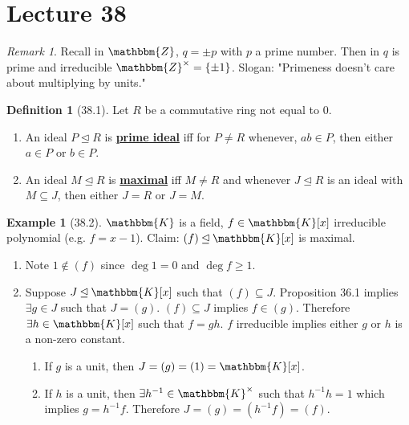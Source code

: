 \documentclass{article}
\newcommand{\Z}{\mathbbm{Z}}
\newcommand{\inverse}[1]{#1^{-1}}
\newcommand{\define}[1]{\textbf{\underline{#1}}}
\renewcommand{\Subset}{\subseteq}
\theoremstyle{definition}
\newtheorem*{defn}{Definition}
\newtheorem*{ex}{Example}
\theoremstyle{remark}
\newtheorem*{rmk}{Remark}
\newcommand{\ideal}{\unlhd}
\newcommand{\K}{\mathbbm{K}}
\begin{document}
    \section*{Lecture 38}{
        \begin{rmk}
            Recall in $\Z$, $q= \pm p$ with $p$ a prime number. Then in $q$ is prime and irreducible $\Z^\times =\{\pm 1\}$. Slogan: "Primeness doesn't care about multiplying by units."
        \end{rmk}
        
        \begin{defn}[38.1]
            Let $R$ be a commutative ring not equal to $0$.
            \begin{enumerate}
                \item An ideal $P \ideal R$ is \define{prime ideal} iff for $P\neq R$ whenever, $ab \in P$, then either $a \in P$ or $b \in P$.
                \item An ideal $M \ideal R$ is \define{maximal} iff $M\neq R$ and whenever $J \ideal R$ is an ideal with $M \Subset J$, then either $J=R$ or $J=M$.
            \end{enumerate}
        \end{defn}
        
    \begin{ex}[38.2]
        $\K$ is a field, $f \in \K[x]$ irreducible polynomial (e.g. $f=x-1$). Claim: $(f)\ideal \K[x]$ is maximal.
        \begin{enumerate}
            \item Note $1 \notin (f)$ since $\deg1=0$ and $\deg f\geq 1$.
            \item Suppose $J\ideal \K[x]$ such that $(f)\Subset J$. Proposition 36.1 implies $\exists g \in J$ such that $J=(g)$. $(f)\Subset J$ implies $f \in (g)$. Therefore $\exists h \in \K[x]$ such that $f=gh$. $f$ irreducible implies either $g$ or $h$ is a non-zero constant.
            \begin{enumerate}
                \item If $g$ is a unit, then $J=(g)=(1)=\K[x]$.
                \item If $h$ is a unit, then $\exists \inverse{h} \in \K^\times$ such that $\inverse{h}h=1$ which implies $g=\inverse{h}f$. Therefore $J=(g)=(\inverse{h}f)=(f)$.
            \end{enumerate}
        \end{enumerate}
    \end{ex}
    
}
\end{document}
